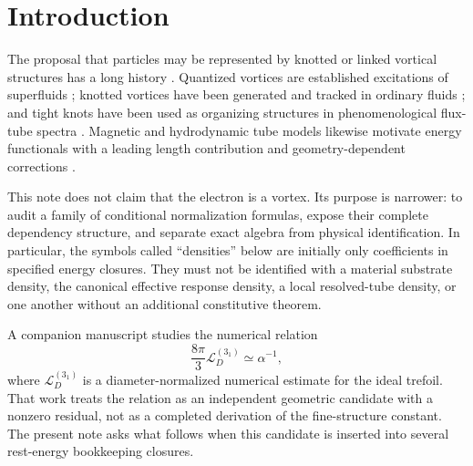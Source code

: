 \documentclass[aps,pre,preprint,notitlepage,nofootinbib,superscriptaddress]{revtex4-2}
\begin{document}
\begin{abstract}
The analysis isolates five independent gates: dynamical selection and numerical provenance of the ideal ropelength, computation of the line-energy coefficient, constitutive identification of the relevant density, derivation of the circulation sector, and Maxwell/source matching including the electromagnetic self-energy shape factor.  The first four can fix an \(\alpha\)-free geometric candidate; only the Maxwell/source gate can identify that candidate with the electromagnetic fine-structure constant.
The model derives neither \(\alpha\), \(m_e\), nor a medium density.
Its present content is a transparent algebraic scaffold and a preregistered falsification programme.
\end{abstract}

\maketitle

\section{Introduction}
\label{sec:intro}

The proposal that particles may be represented by knotted or linked vortical structures has a long history \cite{Thomson1867}.  Quantized vortices are established excitations of superfluids \cite{Onsager1949,Feynman1955,Vinen1961,Donnelly1991}; knotted vortices have been generated and tracked in ordinary fluids \cite{KlecknerIrvine2013}; and tight knots have been used as organizing structures in phenomenological flux-tube spectra \cite{BuniyKephart2005,BuniyEtAl2014}.  Magnetic and hydrodynamic tube models likewise motivate energy functionals with a leading length contribution and geometry-dependent corrections \cite{ChuiMoffatt1995,MaggioniRicca2009,Saffman1992}.

This note does not claim that the electron is a vortex.  Its purpose is narrower: to audit a family of conditional normalization formulas, expose their complete dependency structure, and separate exact algebra from physical identification.  In particular, the symbols called ``densities'' below are initially only coefficients in specified energy closures.  They must not be identified with a material substrate density, the canonical effective response density, a local resolved-tube density, or one another without an additional constitutive theorem.

A companion manuscript \cite{Iskandarani2026} studies the numerical relation
\[
\frac{8\pi}{3}\mathcal L_D^{(3_1)}
\simeq \alpha^{-1},
\]
where \(\mathcal L_D^{(3_1)}\) is a diameter-normalized numerical estimate for the ideal trefoil.  That work treats the relation as an independent geometric candidate with a nonzero residual, not as a completed derivation of the fine-structure constant.  The present note asks what follows when this candidate is inserted into several rest-energy bookkeeping closures.
\end{document}
